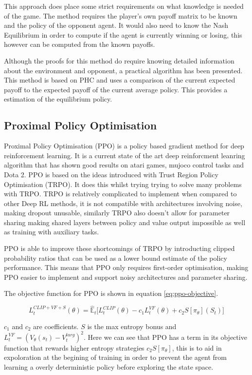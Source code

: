 \documentclass[conference]{IEEEtran}
\begin{document}
This approach does place some strict requirements on what knowledge is needed of the game. The method requires
the player's own payoff matrix to be known and the policy of the opponent agent. It would also need to know
the Nash Equilibrium in order to compute if the agent is currently winning or losing, this however can be 
computed from the known payoffs.

Although the proofs for this method do require knowing detailed information about the environment and opponent,
a practical algorithm has been presented. This method is based on PHC and uses a comparison of the current expected
payoff to the expected payoff of the current average policy. This provides a estimation of the equilibrium policy.

\subsection{Proximal Policy Optimisation}

Proximal Policy Optimisation (PPO) is a policy based gradient method for deep reinforcement learning. It is a current state of the art deep reinforcment leanring algorithm that has shown good results on atari games, mujoco control tasks and Dota 2. PPO is based on the ideas introduced with Trust Region Policy Optimisation (TRPO). It does this whilst trying trying to solve many problems with TRPO. TRPO is relatively complicated to implement when compared to other Deep RL methods, it is not compatible with architectures involving noise, making dropout unusable, similarly TRPO also doesn't allow for parameter sharing making shared layers between policy and value output impossible as well as training with auxiliary tasks.

PPO is able to improve these shortcomings of TRPO by introducting clipped probability ratios that can be used as a lower bound estimate of the policy performance. This means that PPO only requires first-order optimisation, making PPO easier to implement and support noisy architectures and parameter sharing. 

The objective function for PPO is shown in equation \ref{eq:ppo-objective}. 

\begin{equation}
    L_t^{CLIP+VF+S}(\theta) = \hat{\mathbb{E}}_t\big[L_t^{CLIP}(\theta)-c_1L_t^{VF}(\theta)+c_2S[\pi_{\theta}](S_t)\big]
    \label{eq:ppo-objective}
\end{equation}

$c_1$ and $c_2$ are coefficients. $S$ is the max entropy bonus and $L_t^{VF} = (V_{\theta}(s_t)-V_t^{targ})^2$. Here we can see that PPO has a term in its objective function that rewards higher entropy strategies $c_2S[\pi_{\theta}]$, this is to aid in expoloration at the begining of training in order to prevent the agent from learning a overly deterministic policy before exploring the state space. 
\end{document}
